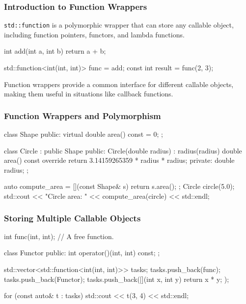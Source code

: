 \subsubsection{Introduction to Function Wrappers}

\texttt{std::function} is a polymorphic wrapper that can store any callable object, including function pointers, functors, and lambda functions.

\begin{codeblock}[language=C++]
int add(int a, int b) {
    return a + b;
}

std::function<int(int, int)> func = add;
const int result = func(2, 3);
\end{codeblock}

Function wrappers provide a common interface for different callable objects, making them useful in situations like callback functions.

\subsubsection{Function Wrappers and Polymorphism}

\begin{codeblock}[language=C++]
class Shape {
public:
    virtual double area() const = 0;
};

class Circle : public Shape {
public:
    Circle(double radius) : radius(radius) {}
    double area() const override { return 3.14159265359 * radius * radius; }
private:
    double radius;
};

auto compute_area = [](const Shape& s) { return s.area(); };
Circle circle(5.0);
std::cout << "Circle area: " << compute_area(circle) << std::endl;
\end{codeblock}

\subsubsection{Storing Multiple Callable Objects}

\begin{codeblock}[language=C++]
int func(int, int); // A free function.

class Functor {
public:
    int operator()(int, int) const;
};

std::vector<std::function<int(int, int)>> tasks;
tasks.push_back(func);
tasks.push_back(Functor{});
tasks.push_back([](int x, int y){ return x * y; });

for (const auto& t : tasks)
    std::cout << t(3, 4) << std::endl;
\end{codeblock}

